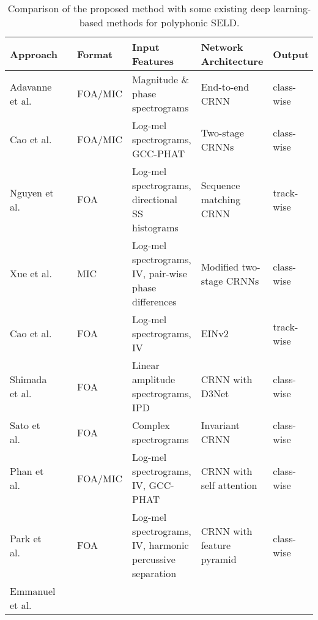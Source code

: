 \documentclass[journal]{IEEEtran}
\newcommand*{\etal}{ et al.\ \xspace}
\begin{document}
\begin{table*}[t]
    \centering
    \caption {Comparison of the proposed method with some existing deep learning-based methods for polyphonic SELD.}  
    \label{table:seld_literatures}
    {
\setlength\tabcolsep{3pt}
\begin{tabularx}{\textwidth}{l@{ }llXll}
\toprule
    Approach & &
    Format & 
    Input Features & 
    Network Architecture &
    Output\\
\midrule 
    Adavanne\etal{} & \cite{Adavanne2019SoundNetworks} &   
        FOA/MIC & 
        Magnitude \& phase spectrograms &   
        End-to-end CRNN &   
        class-wise\\
    Cao\etal{} & \cite{Cao2019PolyphonicStrategy} &   
        FOA/MIC    & 
        Log-mel spectrograms, GCC-PHAT &   
        Two-stage CRNNs    &  
        class-wise   \\
    Nguyen\etal{} & \cite{Nguyen2020ADetection}           &   
        FOA         & 
        Log-mel spectrograms, {directional SS histograms}    &   Sequence matching CRNN   &   
        track-wise  \\
    Xue\etal{} & \cite{Xue2020SoundLearning}    &   
        MIC     & 
        Log-mel spectrograms, IV, {pair-wise phase differences}  &   
        Modified two-stage CRNNs    & 
        class-wise \\
    Cao\etal{} & \cite{Cao2021AnDetection}            &   
        FOA         & 
        Log-mel spectrograms, IV &   
        EINv2 & track-wise    \\ 
    Shimada\etal{} & \cite{Shimada2021ACCDOA:Detection}   &   
        FOA         & 
        Linear amplitude spectrograms, IPD     & 
        CRNN with D3Net   & 
        class-wise  \\
    Sato\etal{} & \cite{Sato2021AmbisonicEquivariance}   &   
        FOA         & 
        Complex spectrograms                      & 
        Invariant CRNN    &  
        class-wise \\
    Phan\etal{} & \cite{Phan2020OnLocalization}       &   
        FOA/MIC    & 
        Log-mel spectrograms, IV, GCC-PHAT  &   
        CRNN with self attention     & 
        class-wise \\
    Park\etal{} & \cite{Park2020SoundFunctions}       &   
        FOA         & 
        Log-mel spectrograms, IV, {harmonic percussive separation}  &   
        CRNN with feature pyramid   & 
        class-wise \\
    Emmanuel\etal{} & \cite{Emmanuel2021Multi-scaleDetection} &   

\end{tabularx}}
\end{table*}
\end{document}
